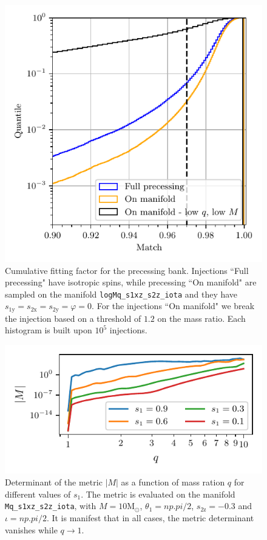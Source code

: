 \documentclass[twocolumn,showpacs,preprintnumbers,nofootinbib,prd,
superscriptaddress,10pt]{revtex4-2}
\begin{document}
\begin{figure}[t]
	\centering
	\includegraphics[scale = 1.]{precessing_hist}
	\caption{Cumulative fitting factor for the precessing bank. Injections ``Full precessing" have isotropic spins, while precessing ``On manifold" are sampled on the manifold \texttt{logMq\_s1xz\_s2z\_iota} and they have $s_\text{1y} = s_\text{2x} = s_\text{2y} = \varphi = 0$. For the injections ``On manifold" we break the injection based on a threshold of $1.2$ on the mass ratio. Each histogram is built upon $10^5$ injections.}
	\label{fig:precessing_hist}
\end{figure}


\begin{figure}[t]
	\centering
	\includegraphics[scale = 1.]{metric_det_vs_q}
	\caption{Determinant of the metric $|M|$ as a function of mass ration $q$ for different values of $s_1$. The metric is evaluated on the manifold \texttt{Mq\_s1xz\_s2z\_iota}, with $M = 10\mathrm{M_\odot}$, $\theta_1 = np.pi/2$, $s_\text{2z} = -0.3$ and $\iota = np.pi/2$. It is manifest that in all cases, the metric determinant vanishes while $q \to 1$.}
	\label{fig:metric_vs_q}
\end{figure}
\end{document}
